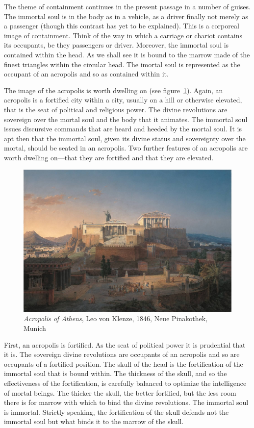 The theme of containment continues in the present passage in a number of guises. The immortal soul is in the body as in a vehicle, as a driver finally not merely as a passenger (though this contrast has yet to be explained). This is a corporeal image of containment. Think of the way in which a carriage or chariot contains its occupants, be they passengers or driver. Moreover, the immortal soul is contained within the head. As we shall see it is bound to the marrow made of the finest triangles within the circular head. The imortal soul is represented as the occupant of an acropolis and so as contained within it. 

The image of the acropolis is worth dwelling on (see figure~\ref{acropolis}). Again, an acropolis is a fortified city within a city, usually on a hill or otherwise elevated, that is the seat of political and religious power. The divine revolutions are sovereign over the mortal soul and the body that it animates. The immortal soul issues discursive commands that are heard and heeded by the mortal soul. It is apt then that the immortal soul, given its divine status and sovereignty over the mortal, should be seated in an acropolis. Two further features of an acropolis are worth dwelling on---that they are fortified and that they are elevated.

\begin{figure}[htbp]
     \centering
         \includegraphics[scale=0.20]{graphics/Akropolis_by_Leo_von_Klenze.jpg}
     \caption{\emph{Acropolis of Athens}, Leo von Klenze, 1846, Neue Pinakothek, Munich}
     \label{acropolis}
\end{figure}

First, an acropolis is fortified. As the seat of political power it is prudential that it is. The sovereign divine revolutions are occupants of an acropolis and so are occupants of a fortified position. The skull of the head is the fortification of the immortal soul that is bound within. The thickness of the skull, and so the effectiveness of the fortification, is carefully balanced to optimize the intelligence of mortal beings. The thicker the skull, the better fortified, but the less room there is for marrow with which to bind the divine revolutions. The immortal soul is immortal. Strictly speaking, the fortification of the skull defends not the immortal soul but what binds it to the marrow of the skull. 

